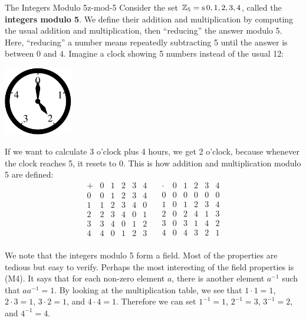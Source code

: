 \begin{example}{The Integers Modulo 5}{z-mod-5}
  Consider the set $\mathbb{Z}_5=\mathop{\textrm{s}}\nolimits{0,1,2,3,4}$, called the
  \textbf{integers modulo 5}. We define their
  addition and multiplication by computing the usual addition and
  multiplication, then ``reducing'' the answer modulo 5. Here,
  ``reducing'' a number means repeatedly subtracting 5 until the
  answer is between $0$ and $4$. Imagine a clock showing 5 numbers
  instead of the usual 12:
  \begin{center}
    \includegraphics[width=3cm]{figures/clock}
  \end{center}
  If we want to calculate 3 o'clock plus 4 hours, we get 2 o'clock,
  because whenever the clock reaches 5, it resets to 0. This is how
  addition and multiplication modulo 5 are defined:
  \begin{equation*}
    \begin{array}{l|lllll}
      +&0&1&2&3&4 \\\hline
      0&0&1&2&3&4 \\
      1&1&2&3&4&0 \\
      2&2&3&4&0&1 \\
      3&3&4&0&1&2 \\
      4&4&0&1&2&3 \\
    \end{array}
    \quad
    \begin{array}{l|lllll}
      \cdot&0&1&2&3&4 \\\hline
      0&0&0&0&0&0 \\
      1&0&1&2&3&4 \\
      2&0&2&4&1&3 \\
      3&0&3&1&4&2 \\
      4&0&4&3&2&1 \\
    \end{array}
  \end{equation*}
\end{example}

We note that the integers modulo 5 form a field. Most of the
properties are tedious but easy to verify. Perhaps the most
interesting of the field properties is (M4). It says that for each
non-zero element $a$, there is another element $a^{-1}$ such that
$aa^{-1}=1$.  By looking at the multiplication table, we see that
$1\cdot 1=1$, $2\cdot 3=1$, $3\cdot 2=1$, and $4\cdot 4=1$. Therefore
we can set $1^{-1}=1$, $2^{-1}=3$, $3^{-1}=2$, and $4^{-1}=4$.

